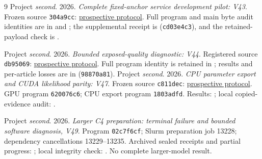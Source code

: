 \documentclass[10pt,twocolumn,letterpaper]{article}
\begin{document}
\begin{thebibliography}{9}
Project \emph{second}. 2026. \emph{Complete fixed-anchor service development
pilot: V43}. Frozen source \texttt{304a9cc}:
\href{https://github.com/priyankjairaj100/second/blob/304a9cc73b3c263032f3ef6a02487b4d2df40fbe/research_v43/PROTOCOL.txt}{prospective protocol}.
Full program and main byte audit identities are in
 and
;
the supplemental receipt is
(\texttt{cd03e4c3}), and the retained-payload check is
.

Project \emph{second}. 2026. \emph{Bounded exposed-quality diagnostic: V44}.
Registered source \texttt{db95069}:
\href{https://github.com/priyankjairaj100/second/blob/db95069b2c3484ac615052fb1c1a711c8c773c2d/research_v44/PROTOCOL.txt}{prospective protocol}.
Full program identity is retained in
; results and
per-article losses are in
(\texttt{98870a81}).
Project \emph{second}. 2026. \emph{CPU parameter export and CUDA likelihood parity: V47}.
Frozen source \texttt{c811dec}:
\href{https://github.com/priyankjairaj100/second/blob/c811dec/research_v47/PROTOCOL.txt}{prospective protocol}.
GPU program \texttt{620076c6}; CPU export program \texttt{1803adfd}.
Results: ;
local copied-evidence audit: .

Project \emph{second}. 2026. \emph{Larger C4 preparation: terminal failure and
bounded software diagnosis, V49}.
Program \texttt{02c7f6cf}; Slurm preparation job 13228; dependency cancellations
13229--13235. Archived sealed receipts and partial progress:
; local integrity check:
. No complete larger-model result.

\end{thebibliography}
\end{document}
